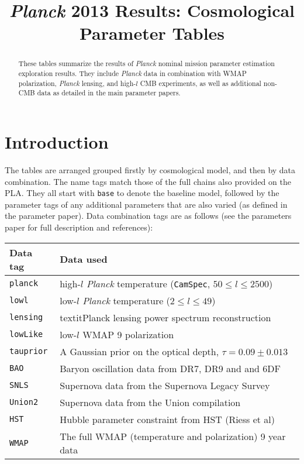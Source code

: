 \title{\textit{Planck} 2013 Results: Cosmological Parameter Tables}


\maketitle
\begin{abstract}
These tables summarize the results of \textit{Planck} nominal mission parameter estimation exploration results. They include \textit{Planck}  data in combination with WMAP polarization, \textit{Planck} lensing, and high-$l$ CMB experiments, as well as additional non-CMB data as detailed in the main parameter papers.
\end{abstract}

\section*{Introduction}

The tables are arranged grouped firstly by cosmological model, and then by data combination. The name tags match those of the full chains also provided on the PLA. They all start with {\tt base} to denote the baseline model, followed by the parameter tags of any additional parameters that are also varied (as defined in the parameter paper). Data combination tags are as follows (see the parameters paper for full description and references):

\begin{tabular} { l   l  }
Data tag & Data used\\
\hline
{\tt planck}         & high-$l$ \textit{Planck}  temperature ({\tt CamSpec}, $50\le l\le 2500$) \\
{\tt lowl }          & low-$l$ \textit{Planck}  temperature ($2\le l \le 49$)  \\
{\tt lensing}        & textit{Planck}  lensing power spectrum reconstruction \\
{\tt lowLike}        & low-$l$ WMAP 9 polarization \\
{\tt tauprior}       & A Gaussian prior on the optical depth, $\tau = 0.09 \pm 0.013$ \\
{\tt BAO}            & Baryon oscillation data from DR7, DR9 and and 6DF \\
{\tt SNLS}           & Supernova data from the Supernova Legacy Survey \\
{\tt Union2}         & Supernova data from the Union compilation \\
{\tt HST}            & Hubble parameter constraint from HST (Riess et al) \\
{\tt WMAP}           & The full WMAP (temperature and polarization) 9 year data \\
\hline
\end{tabular}
\vskip 1cm

